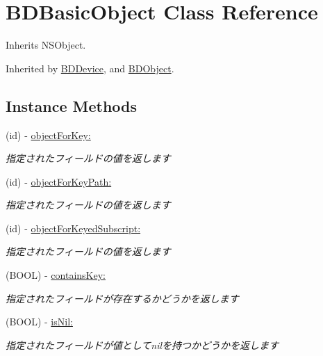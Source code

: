 \hypertarget{interface_b_d_basic_object}{\section{B\-D\-Basic\-Object Class Reference}
\label{interface_b_d_basic_object}
}


Inherits N\-S\-Object.



Inherited by \hyperlink{interface_b_d_device}{B\-D\-Device}, and \hyperlink{interface_b_d_object}{B\-D\-Object}.

\subsection*{Instance Methods}
\begin{DoxyCompactItemize}
\item 
(id) -\/ \hyperlink{interface_b_d_basic_object_a6b4e14ef5517d45bac65d17415c7a02a}{object\-For\-Key\-:}
\begin{DoxyCompactList}\small\item\em 指定されたフィールドの値を返します \end{DoxyCompactList}\item 
(id) -\/ \hyperlink{interface_b_d_basic_object_afec613d01eacba9dc71ba4229e3414e4}{object\-For\-Key\-Path\-:}
\begin{DoxyCompactList}\small\item\em 指定されたフィールドの値を返します \end{DoxyCompactList}\item 
(id) -\/ \hyperlink{interface_b_d_basic_object_a4b499cf758f317e629ed4471d7723672}{object\-For\-Keyed\-Subscript\-:}
\begin{DoxyCompactList}\small\item\em 指定されたフィールドの値を返します \end{DoxyCompactList}\item 
(B\-O\-O\-L) -\/ \hyperlink{interface_b_d_basic_object_a0ab2219a2884e29b550ee989912278da}{contains\-Key\-:}
\begin{DoxyCompactList}\small\item\em 指定されたフィールドが存在するかどうかを返します \end{DoxyCompactList}\item 
(B\-O\-O\-L) -\/ \hyperlink{interface_b_d_basic_object_a09e74fe10185775a572177e90e499f0e}{is\-Nil\-:}
\begin{DoxyCompactList}\small\item\em 指定されたフィールドが値としてnilを持つかどうかを返します \end{DoxyCompactList}\item 

\end{DoxyCompactItemize}
